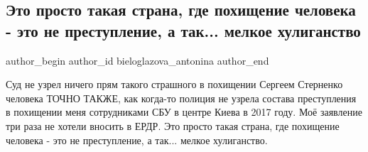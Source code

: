  
 
 
 
 
 
\subsection{Это просто такая страна, где похищение человека - это не преступление, а так... мелкое хулиганство}
\label{sec:31_05_2021.fb.bieloglazova_antonina.1.pohischenie_2017_sbu_kiev_tonja}
\ifcmt
 author_begin
   author_id bieloglazova_antonina
 author_end
\fi

Суд не узрел ничего прям такого страшного в похищении Сергеем Стерненко
человека ТОЧНО ТАКЖЕ, как когда-то полиция не узрела состава преступления в
похищении меня сотрудниками СБУ в центре Киева в 2017 году. Моё заявление три
раза не хотели вносить в ЕРДР. Это просто такая страна, где похищение человека
- это не преступление, а так... мелкое хулиганство.

